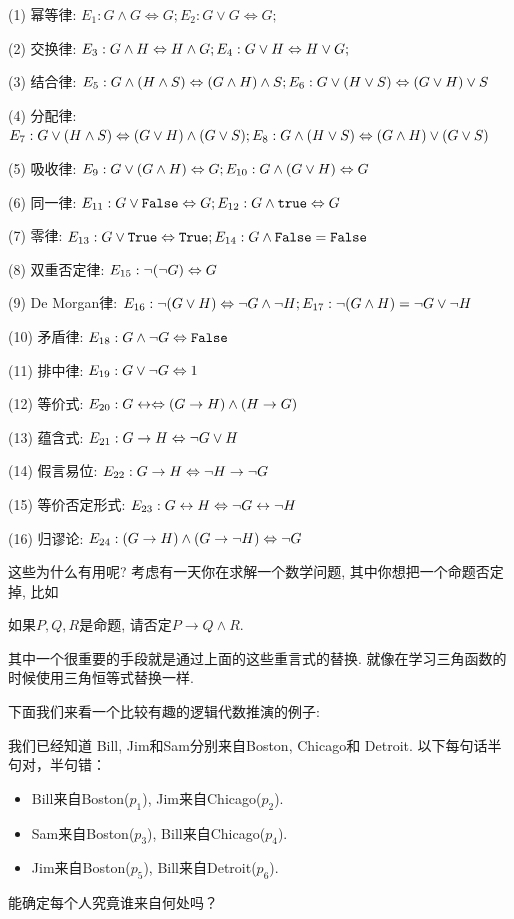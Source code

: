 \begin{proposition}[基本等价定律]
	(1) 幂等律: $E_1:G\land G\Leftrightarrow G; E_2:G\lor G\Leftrightarrow G;$
	
	(2) 交换律: $E_3: G\land H \Leftrightarrow H \land G; E_4: G\lor H \Leftrightarrow H \lor G;$
	
	(3) 结合律: $E_5: G\land(H\land S)\Leftrightarrow (G\land H)\land S; E_6: G\lor(H\lor S)\Leftrightarrow (G\lor H)\lor S$
	
	(4) 分配律: $E_7: G\lor(H\land S) \Leftrightarrow (G\lor H)\land (G\lor S); E_8: G\land (H\lor S)\Leftrightarrow (G\land H)\lor (G\lor S)$
	
	(5) 吸收律: $E_9: G\lor (G\land H)\Leftrightarrow G; E_{10}: G\land (G\lor H)\Leftrightarrow G$
	
	(6) 同一律: $E_{11}: G\lor \texttt{False}\Leftrightarrow G; E_{12}: G\land \texttt{true}\Leftrightarrow G$
	
	(7) 零律: $E_{13}: G\lor \texttt{True}\Leftrightarrow \texttt{True}; E_{14}: G\land \texttt{False}=\texttt{False}$
	
	(8) 双重否定律: $E_{15}: \lnot (\lnot G)\Leftrightarrow G$
	
	(9) De Morgan律: $E_{16}: \lnot (G\lor H)\Leftrightarrow \lnot G \land \lnot H; E_{17}: \lnot (G\land H)=\lnot G\lor \lnot H$
	
	(10) 矛盾律: $E_{18}:G\land \lnot G\Leftrightarrow \texttt{False}$
	
	(11) 排中律: $E_{19}:G\lor \lnot G\Leftrightarrow 1$
	
	(12) 等价式: $E_{20}:G\leftrightarrow \Leftrightarrow (G\to H)\land (H\to G)$
	
	(13) 蕴含式: $E_{21}: G\to H\Leftrightarrow \lnot G\lor H$
	
	(14) 假言易位: $E_{22}: G\to H \Leftrightarrow \lnot H\to \lnot G$
	
	(15) 等价否定形式: $E_{23}: G\leftrightarrow H \Leftrightarrow \lnot G\leftrightarrow \lnot H$
	
	(16) 归谬论: $E_{24}: (G\to H)\land (G\to \lnot H) \Leftrightarrow \lnot G$
	
\end{proposition}

这些为什么有用呢? 考虑有一天你在求解一个数学问题, 其中你想把一个命题否定掉, 比如

\begin{prob}
	如果$P,Q,R$是命题, 请否定$P\to Q\land R$. 
\end{prob}

其中一个很重要的手段就是通过上面的这些重言式的替换. 就像在学习三角函数的时候使用三角恒等式替换一样. 

下面我们来看一个比较有趣的逻辑代数推演的例子: 
\begin{prob}
	我们已经知道 Bill, Jim和Sam分别来自Boston, Chicago和 Detroit. 以下每句话半句对，半句错：
	\begin{itemize}
		\item Bill来自Boston($p_1$), Jim来自Chicago($p_2$).
		\item Sam来自Boston($p_3$), Bill来自Chicago($p_4$).
		\item Jim来自Boston($p_5$), Bill来自Detroit($p_6$).
	\end{itemize}
	能确定每个人究竟谁来自何处吗？
\end{prob}

